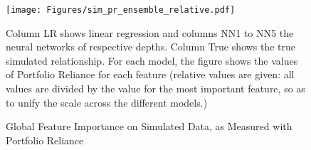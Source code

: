 		\begin{figure}
			\centering
			\texttt{[image: Figures/sim\_pr\_ensemble\_relative.pdf]}
			\caption{Global Feature Importance on Simulated Data, as Measured with Portfolio Reliance}
			\label{fig:sim_pr_ensemble_relative}
			\medskip
			\small
			Column LR shows linear regression and columns NN1 to NN5 the neural networks of respective depths. Column True shows the true simulated relationship. For each model, the figure shows the values of Portfolio Reliance for each feature (relative values are given: all values are divided by the value for the most important feature, so as to unify the scale across the different models.)
		\end{figure}
	
